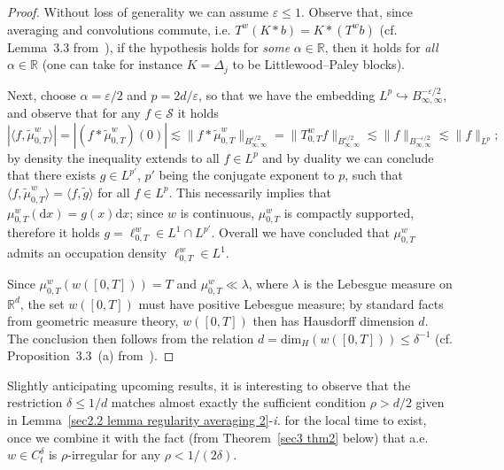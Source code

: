 \documentclass[10pt]{article}
\newcommand{\mathd}{\mathrm{d}}
\newcommand{\tmtextit}[1]{{\itshape{#1}}}
\begin{document}
\begin{proof}
  Without loss of generality we can assume $\varepsilon \leqslant 1$. Observe that, since averaging
  and convolutions commute, i.e. $T^w (K \ast b) = K \ast (T^w b)$ (cf.
  Lemma~3.3 from~{\cite{galeatigubinelli_ode}}), if the hypothesis holds for
  \tmtextit{some} $\alpha \in \mathbb{R}$, then it holds for \tmtextit{all}
  $\alpha \in \mathbb{R}$ (one can take for instance $K = \Delta_j$ to be
  Littlewood--Paley blocks).
  
  Next, choose $\alpha = \varepsilon / 2$ and $p = 2 d / \varepsilon$, so that
  we have the embedding $L^p \hookrightarrow B^{- \varepsilon / 2}_{\infty,
  \infty}$, and observe that for any $f \in \mathcal{S}$ it holds
  \[ | \langle f, \tilde{\mu}_{0, T}^w \rangle | = | (f \ast \tilde{\mu}^w_{0,T}) (0)
     | \lesssim \| f \ast \tilde{\mu}_{0, T}^{w} \|_{B^{\varepsilon
     / 2}_{\infty, \infty}} = \| T^w_{0, T} f \|_{B^{\varepsilon / 2}_{\infty,
     \infty}} \lesssim \| f \|_{B^{- \varepsilon / 2}_{\infty, \infty}}
     \lesssim \| f \|_{L^p} ; \]
  by density the inequality extends to all $f \in L^p$ and by duality we can
  conclude that there exists $g \in L^{p'}$, $p'$ being the conjugate exponent
  to $p$, such that $\langle f, \tilde{\mu}^w_{0, T} \rangle = \langle f,
  \tilde{g} \rangle$ for all $f \in L^p$. This necessarily implies that
  $\mu^w_{0, T} (\mathd x) = g (x) \mathd x$; since $w$ is continuous,
  $\mu^w_{0, T}$ is compactly supported, therefore it holds $g = \ell^w_{0, T}
  \in L^1 \cap L^{p'}$. Overall we have concluded that $\mu^w_{0, T}$ admits
  an occupation density $\ell^w_{0, T} \in L^1$.
  
  Since $\mu^w_{0, T} (w ([0, T])) = T$ and $\mu^w_{0, T} \ll \lambda$,
  where $\lambda$ is the Lebesgue measure on $\mathbb{R}^d$, the set $w ([0, T])$ must have
  positive Lebesgue measure; by standard facts from geometric measure theory,
  $w ([0, T])$ then has Hausdorff dimension $d$. The conclusion then follows
  from the relation $d=\text{dim}_H (w ([0, T])) \leqslant \delta^{- 1}$ (cf.
  Proposition~3.3~(a) from~{\cite{falconer}}).
\end{proof}

Slightly anticipating upcoming results, it is interesting to observe that the
restriction $\delta \leqslant 1 / d$ matches almost exactly the sufficient
condition $\rho > d / 2$ given in Lemma~\ref{sec2.2 lemma regularity averaging
2}\mbox{-}\tmtextit{i.} for the local time to exist, once we combine it with
the fact (from Theorem~\ref{sec3 thm2} below) that a.e. $w \in C^{\delta}_t$
is $\rho$-irregular for any $\rho < 1 / (2 \delta)$.
\end{document}

